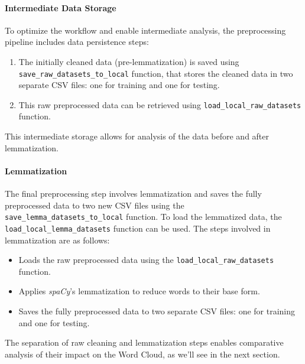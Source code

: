 \documentclass[12pt]{article}
\begin{document}
\paragraph{Intermediate Data Storage}
To optimize the workflow and enable intermediate analysis, the preprocessing pipeline includes data persistence steps:

\begin{enumerate}
    \item The initially cleaned data (pre-lemmatization) is saved using \\ \texttt{save\_raw\_datasets\_to\_local} function, that stores the cleaned data in two separate CSV files: one for training and one for testing.
    \item This raw preprocessed data can be retrieved using \texttt{load\_local\_raw\_datasets} function.
\end{enumerate}
This intermediate storage allows for analysis of the data before and after lemmatization.

\paragraph{Lemmatization}
The final preprocessing step involves lemmatization and saves the fully preprocessed data to two new CSV files using the \texttt{save\_lemma\_datasets\_to\_local} function. To load the lemmatized data, the \texttt{load\_local\_lemma\_datasets} function can be used.
The steps involved in lemmatization are as follows:
\begin{itemize}
    \item Loads the raw preprocessed data using the \texttt{load\_local\_raw\_datasets} function.
    \item Applies \textit{spaCy}'s lemmatization to reduce words to their base form.
    \item Saves the fully preprocessed data to two separate CSV files: one for training and one for testing.
\end{itemize}

The separation of raw cleaning and lemmatization steps enables comparative analysis of their impact on the Word Cloud, as we'll see in the next section.


\end{document}
